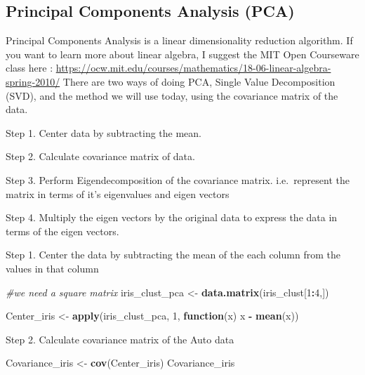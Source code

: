 \documentclass[11pt,]{article}
\newenvironment{Shaded}{\begin{snugshade}}{\end{snugshade}}
\newcommand{\CommentTok}[1]{\textcolor[rgb]{0.56,0.35,0.01}{\textit{#1}}}
\newcommand{\ControlFlowTok}[1]{\textcolor[rgb]{0.13,0.29,0.53}{\textbf{#1}}}
\newcommand{\DecValTok}[1]{\textcolor[rgb]{0.00,0.00,0.81}{#1}}
\newcommand{\KeywordTok}[1]{\textcolor[rgb]{0.13,0.29,0.53}{\textbf{#1}}}
\newcommand{\NormalTok}[1]{#1}
\newcommand{\OperatorTok}[1]{\textcolor[rgb]{0.81,0.36,0.00}{\textbf{#1}}}
\newcommand{\StringTok}[1]{\textcolor[rgb]{0.31,0.60,0.02}{#1}}
\begin{document}
\newpage

\hypertarget{principal-components-analysis-pca}{%
\subsection{Principal Components Analysis
(PCA)}\label{principal-components-analysis-pca}}

Principal Components Analysis is a linear dimensionality reduction
algorithm. If you want to learn more about linear algebra, I suggest the
MIT Open Courseware class here :
\url{https://ocw.mit.edu/courses/mathematics/18-06-linear-algebra-spring-2010/}
There are two ways of doing PCA, Single Value Decomposition (SVD), and
the method we will use today, using the covariance matrix of the data.

Step 1. Center data by subtracting the mean.

Step 2. Calculate covariance matrix of data.

Step 3. Perform Eigendecomposition of the covariance matrix.
i.e.~represent the matrix in terms of it's eigenvalues and eigen vectors

Step 4. Multiply the eigen vectors by the original data to express the
data in terms of the eigen vectors.

Step 1. Center the data by subtracting the mean of the each column from
the values in that column

\begin{Shaded}
\begin{Highlighting}[]
\CommentTok{#we need a square matrix}
\NormalTok{iris_clust_pca <-}\StringTok{ }\KeywordTok{data.matrix}\NormalTok{(iris_clust[}\DecValTok{1}\OperatorTok{:}\DecValTok{4}\NormalTok{,])}

\NormalTok{Center_iris <-}\StringTok{ }\KeywordTok{apply}\NormalTok{(iris_clust_pca, }\DecValTok{1}\NormalTok{, }\ControlFlowTok{function}\NormalTok{(x) x }\OperatorTok{-}\StringTok{ }\KeywordTok{mean}\NormalTok{(x))}
\end{Highlighting}
\end{Shaded}

Step 2. Calculate covariance matrix of the Auto data

\begin{Shaded}
\begin{Highlighting}[]
\NormalTok{Covariance_iris <-}\StringTok{ }\KeywordTok{cov}\NormalTok{(Center_iris)}
\NormalTok{Covariance_iris}
\end{Highlighting}
\end{Shaded}
\end{document}
